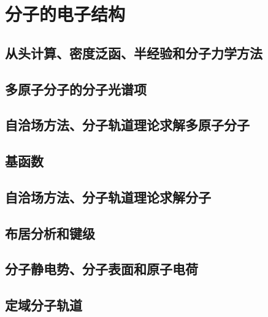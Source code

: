 \chapter{分子的电子结构}
\label{chap:15}
\section{从头计算、密度泛函、半经验和分子力学方法}
\label{sec:15.1 Ab Initio, Density-Functional, Semiempirical and Molecular-Mechanics Methods}

\section{多原子分子的分子光谱项}
\label{sec:15.2 Electronic Terms of Polyatomic Molecules}

\section{自洽场方法、分子轨道理论求解多原子分子}
\label{sec:15.3 The SCF MO Treatment of Polyatomic Molecules}

\section{基函数}
\label{sec:15.4 Basis Functions}

\section{自洽场方法、分子轨道理论求解分子}
\label{sec:15.5 The SCF MO Treatment of H2O}

\section{布居分析和键级}
\label{sec:15.6 Population Analysis and Bond Orders}

\section{分子静电势、分子表面和原子电荷}
\label{sec:15.7 The Molecular Electrostatic Potential, Molecular Surfaces, and Atomic Charges}

\section{定域分子轨道}
\label{sec:15.8 Localized Molecular Orbitals}

